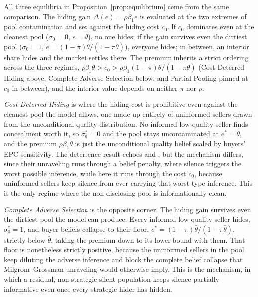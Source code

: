 All three equilibria in Proposition~\ref{prop:equilibrium} come from the same comparison. The hiding gain $\Delta(e)=\rho\beta_1 e$ is evaluated at the two extremes of pool contamination and set against the hiding cost $c_0$. If $c_0$ dominates even at the cleanest pool ($\sigma_0=0$, $e=\bar{\theta}$), no one hides; if the gain survives even the dirtiest pool ($\sigma_0=1$, $e=(1-\pi)\bar{\theta}/(1-\pi\bar{\theta})$), everyone hides; in between, an interior share hides and the market settles there. The premium inherits a strict ordering across the three regimes, $\rho\beta_1\bar{\theta} > c_0 > \rho\beta_1(1-\pi)\bar{\theta}/(1-\pi\bar{\theta})$ (Cost-Deterred Hiding above, Complete Adverse Selection below, and Partial Pooling pinned at $c_0$ in between), and the interior value depends on neither $\pi$ nor $\rho$.

\emph{Cost-Deterred Hiding} is where the hiding cost is prohibitive even against the cleanest pool the model allows, one made up entirely of uninformed sellers drawn from the unconditional quality distribution. No informed low-quality seller finds concealment worth it, so $\sigma_0^*=0$ and the pool stays uncontaminated at $e^*=\bar{\theta}$, and the premium $\rho\beta_1\bar{\theta}$ is just the unconditional quality belief scaled by buyers' EPC sensitivity. The deterrence result echoes \citet{milgrom_good_1981} and \citet{grossman_informational_1981}, but the mechanism differs, since their unraveling runs through a belief penalty, where silence triggers the worst possible inference, while here it runs through the cost $c_0$, because uninformed sellers keep silence from ever carrying that worst-type inference. This is the only regime where the non-disclosing pool is informationally clean.

\emph{Complete Adverse Selection} is the opposite corner. The hiding gain survives even the dirtiest pool the model can produce. Every informed low-quality seller hides, $\sigma_0^*=1$, and buyer beliefs collapse to their floor, $e^*=(1-\pi)\bar{\theta}/(1-\pi\bar{\theta})$, strictly below $\bar{\theta}$, taking the premium down to its lower bound with them. That floor is nonetheless strictly positive, because the uninformed sellers in the pool keep diluting the adverse inference and block the complete belief collapse that Milgrom--Grossman unraveling would otherwise imply. This is the \citet{dye_disclosure_1985} mechanism, in which a residual, non-strategic silent population keeps silence partially informative even once every strategic hider has hidden.

